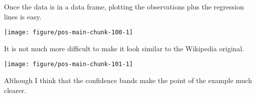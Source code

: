 \documentclass[krantz2]{krantz}\usepackage{knitr}%
\begin{document}
Once the data is in a data frame, plotting the observations plus the regression lines is easy.

\begin{knitrout}\footnotesize
{}\color{fgcolor}\begin{kframe}
\begin{alltt}
  \hlopt{+}
  \hlstd{()} \hlopt{+}
  \hlstd{(} \hlstd{=} \hlstd{)} \hlopt{+}
  \hlstd{(}\hlopt{~}  \hlstd{=} \hlstd{)}
\end{alltt}
\end{kframe}

{\centering \texttt{[image: figure/pos-main-chunk-100-1]} 

}



\end{knitrout}

It is not much more difficult to make it look similar to the Wikipedia original.

\begin{knitrout}\footnotesize
{}\color{fgcolor}\begin{kframe}
\begin{alltt}
  \hlopt{+}
  \hlstd{(} \hlstd{=} \hlstd{,}  \hlstd{=} \hlstd{,}  \hlstd{=} \hlstd{)} \hlopt{+}
  \hlstd{(} \hlstd{=} \hlstd{,}  \hlstd{=} \hlstd{)} \hlopt{+}
  \hlstd{(}\hlopt{~}  \hlstd{=} \hlstd{)} \hlopt{+}
  \hlstd{(}\hlstd{)}
\end{alltt}
\end{kframe}

{\centering \texttt{[image: figure/pos-main-chunk-101-1]} 

}



\end{knitrout}

Although I think that the confidence bands make the point of the example much clearer.
\end{document}

